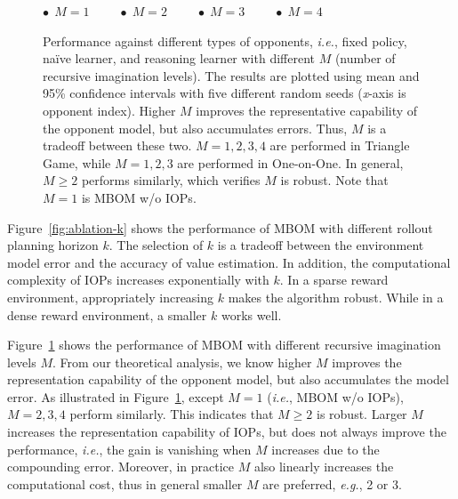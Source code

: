 \documentclass{article}
\begin{document}
\begin{figure}[h]
    \begin{footnotesize}
    \centering
    \textcolor[RGB]{76,114,176}{$\bullet\ \ $}$M=1$\ \ \ \ \ \textcolor[RGB]{221,132,82}{$\bullet\ \ $}$M=2$\ \ \ \ \ \textcolor[RGB]{85,168,104}{$\bullet\ \ $}$M=3$\ \ \ \ \ \textcolor[RGB]{196,78,82}{$\bullet\ \ $}$M=4$
    \end{footnotesize}
    \caption{Performance against different types of opponents, \textit{i.e.}, fixed policy, na\"ive learner, and reasoning learner with different $M$ (number of recursive imagination levels). The results are plotted using mean and 95\% confidence intervals with five different random seeds (\textit{x}-axis is opponent index). Higher $M$ improves the representative capability of the opponent model, but also accumulates errors. Thus, $M$ is a tradeoff between these two. $M=1,2,3,4$ are performed in Triangle Game, while $M=1,2,3$ are performed in One-on-One. In general, $M\ge 2$ performs similarly, which verifies $M$ is robust. Note that $M=1$ is MBOM w/o IOPs.}
    \label{fig:ablation-M}
\end{figure}

Figure~\ref{fig:ablation-k} shows the performance of MBOM with different rollout planning horizon $k$. The selection of $k$ is a tradeoff between the environment model error and the accuracy of value estimation. In addition, the computational complexity of IOPs increases exponentially with $k$. In a sparse reward environment, appropriately increasing $k$ makes the algorithm robust. While in a dense reward environment, a smaller $k$ works well. 

Figure~\ref{fig:ablation-M} shows the performance of MBOM with different recursive imagination levels $M$. From our theoretical analysis, we know higher $M$ improves the representation capability of the opponent model, but also accumulates the model error. As illustrated in Figure~\ref{fig:ablation-M}, except $M=1$ (\textit{i.e.}, MBOM w/o IOPs), $M=2,3,4$ perform similarly. This indicates that $M \ge 2$ is robust. Larger $M$ increases the representation capability of IOPs, but does not always improve the performance, \textit{i.e.}, the gain is vanishing when $M$ increases due to the compounding error. Moreover, in practice $M$ also linearly increases the computational cost, thus in general smaller $M$ are preferred, \textit{e.g.}, 2 or 3. 

\end{document}
